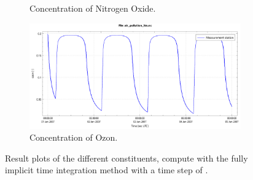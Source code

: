 \begin{figure}[H]
\begin{subfigure}{0.5\textwidth}
        \caption{Concentration of Nitrogen Oxide.}
    \end{subfigure}
    \begin{subfigure}{0.5\textwidth}
        \includegraphics[width=\textwidth]{figures/ozon_dt0d5.pdf}
        \caption{Concentration of Ozon.}
    \end{subfigure}
    \caption[Air pollution experiment: $O$, $N_2$, $NO$ and $O_3$]{Result plots of the different constituents, compute with the fully implicit time integration method with a time step of .}
\end{figure}

